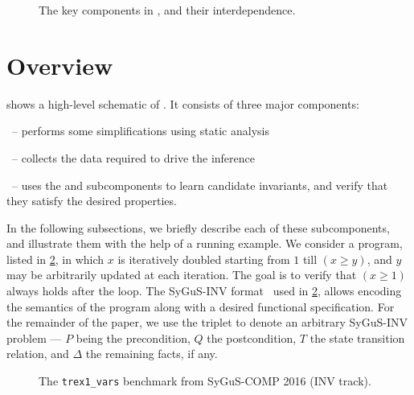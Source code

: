 \documentclass[conference]{IEEEtran}
\begin{document}
\begin{figure}[!t]
\centering
\caption{The key components in \LoopInvGen, and their interdependence.}
\label{fig:overview}
\end{figure}





\section{Overview} \label{subsec:Overview}

\noindent
{} shows a high-level schematic of \LoopInvGen.
It consists of three major components:
\begin{andlist}
    \item \Process\ -- performs some simplifications using static analysis
    \item \Record\ -- collects the data required to drive the inference
    \item \Infer\ -- uses the \PIE and \Checker subcomponents to learn candidate invariants,
          and verify that they satisfy the desired properties.
\end{andlist}

In the following subsections, we briefly describe each of these subcomponents,
and illustrate them with the help of a running example.
We consider a program, listed in \cref{code:sygus},
in which $x$ is iteratively doubled starting from $1$ till $(x \geqslant y)$,
and $y$ may be arbitrarily updated at each iteration.
The goal is to verify that $(x \geqslant 1)$ always holds after the loop.
The SyGuS-INV format~\cite{Alur2016SyGuSComp2R} used in \cref{code:sygus},
allows encoding the semantics of the program along with a desired functional specification.
For the remainder of the paper, we use the triplet \SyGuSINVTriplet to denote an arbitrary SyGuS-INV problem ---
$P$ being the precondition, $Q$ the postcondition, $T$ the state transition relation, and $\Delta$ the remaining facts, if any.

\begin{figure}[!t]
    \begin{tcolorbox}
          [boxrule=0.5pt,arc=2pt,boxsep=0pt,
           left=2pt,right=-10pt,top=-2pt,bottom=-3pt,
           colback=white,colframe=darkbordercolor]
        
    \end{tcolorbox}
    \caption{The \texttt{trex1\_vars} benchmark from SyGuS-COMP 2016 (INV track).}
    \label{code:sygus}
\end{figure}
\end{document}
